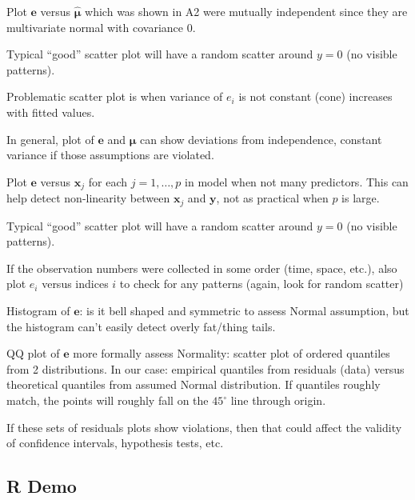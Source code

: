 Plot $ \symbf{e} $ versus $ \hat{\symbf{\mu}} $ which
was shown in A2 were mutually independent
since they are multivariate normal with covariance 0.

Typical ``good'' scatter plot will have a random scatter
around $ y=0 $ (no visible patterns).

Problematic scatter plot is when
variance of $ e_i $ is not constant (cone)
increases with fitted values.

In general, plot of $ \symbf{e} $ and $ \hat{\symbf{\mu}} $
can show deviations from independence, constant variance if those
assumptions are violated.

Plot $ \symbf{e} $ versus $ \symbf{x}_j $ for each $ j=1,\ldots,p $
in model when not many predictors. This can help detect non-linearity
between $ \symbf{x}_j $ and $ \symbf{y} $, not as practical when
$ p $ is large.

Typical ``good'' scatter plot will have a random scatter
around $ y=0 $ (no visible patterns).

If the observation numbers were collected in some order
(time, space, etc.), also plot $ e_i $ versus indices
$ i $ to check for any patterns (again, look for random scatter)

Histogram of $ \symbf{e} $: is it bell shaped and symmetric
to assess Normal assumption, but the histogram can't easily
detect overly fat/thing tails.

QQ plot of $ \symbf{e} $ more formally assess Normality:
scatter plot of ordered quantiles from 2 distributions.
In our case: empirical quantiles from residuals (data)
versus theoretical quantiles from assumed Normal distribution.
If quantiles roughly match, the points will roughly fall
on the $ 45^\circ $ line through origin.

If these sets of residuals plots show violations, then that could
affect the validity of confidence intervals, hypothesis tests, etc.

\subsection{R Demo}

